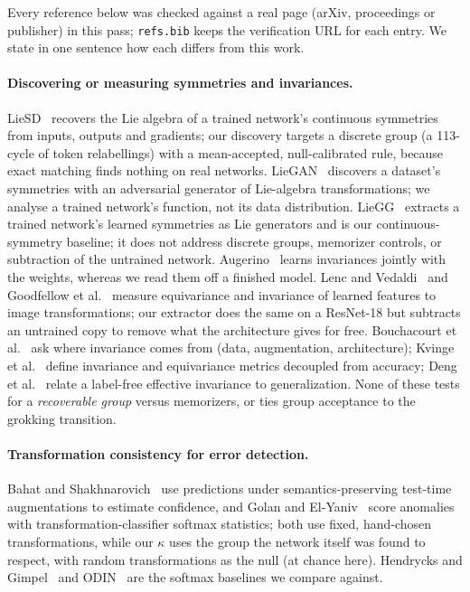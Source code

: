 Every reference below was checked against a real page (arXiv, proceedings or publisher) in this pass; \texttt{refs.bib} keeps the verification URL for each entry. We state in one sentence how each differs from this work.

\paragraph{Discovering or measuring symmetries and invariances.}
LieSD~\cite{liesd} recovers the Lie algebra of a trained network's continuous symmetries from inputs, outputs and gradients; our discovery targets a discrete group (a 113-cycle of token relabellings) with a mean-accepted, null-calibrated rule, because exact matching finds nothing on real networks. LieGAN~\cite{liegan} discovers a dataset's symmetries with an adversarial generator of Lie-algebra transformations; we analyse a trained network's function, not its data distribution. LieGG~\cite{lieg} extracts a trained network's learned symmetries as Lie generators and is our continuous-symmetry baseline; it does not address discrete groups, memorizer controls, or subtraction of the untrained network. Augerino~\cite{augerino} learns invariances jointly with the weights, whereas we read them off a finished model. Lenc and Vedaldi~\cite{lenc} and Goodfellow et al.~\cite{goodfellow2009} measure equivariance and invariance of learned features to image transformations; our extractor does the same on a ResNet-18 but subtracts an untrained copy to remove what the architecture gives for free. Bouchacourt et al.~\cite{bouchacourt2021} ask where invariance comes from (data, augmentation, architecture); Kvinge et al.~\cite{kvinge2022} define invariance and equivariance metrics decoupled from accuracy; Deng et al.~\cite{deng2022} relate a label-free effective invariance to generalization. None of these tests for a \emph{recoverable group} versus memorizers, or ties group acceptance to the grokking transition.

\paragraph{Transformation consistency for error detection.}
Bahat and Shakhnarovich~\cite{bahat2020} use predictions under semantics-preserving test-time augmentations to estimate confidence, and Golan and El-Yaniv~\cite{golan2018} score anomalies with transformation-classifier softmax statistics; both use fixed, hand-chosen transformations, while our $\kappa$ uses the group the network itself was found to respect, with random transformations as the null (at chance here). Hendrycks and Gimpel~\cite{hendrycks2017} and ODIN~\cite{liang2018} are the softmax baselines we compare against.

